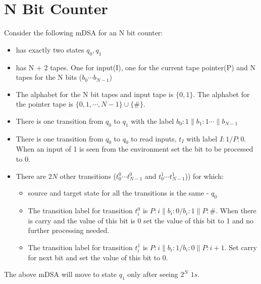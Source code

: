 \section{N Bit Counter}
Consider the following mDSA for an N bit counter:

\begin{itemize}
	\item has exactly two states $q_0, q_1$
	\item has N + 2 tapes. One for input(I), one for the current tape pointer(P) and N tapes for the N bits ($b_0 \cdots b_{N-1}$)
	\item The alphabet for the N bit tapes and input tape is $\{0,1\}$. The alphabet for the pointer tape is $\{0,1, \cdots, N-1\} \cup \{ \# \}$.
	\item There is one transition from $q_0$ to $q_1$ with the label $b_0:1 \| b_1:1 \cdots \| b_{N-1}$
	\item There is one transition from $q_0$ to $q_0$ to read inputs, $t_I$  with label  $I:1 / P:0$. When an input of 1 is seen from the environment set the bit to be processed to 0. 
	\item There are $2N$ other transitions ($t_0^0 \cdots t_{N-1}^0$ and $t_0^1 \cdots t_{N-1}^1$)) for which:
	\begin{itemize}
		\item  source and target state for all the transitions is the same - $q_0$
		\item The transition label for transition $t_i^0$ is $P:i \| b_i:0 / b_i:1 \| P:\#$. When there is carry and the value of this bit is 0 set the value of this bit to 1 and no further processing needed. 
		\item The transition label for transition $t_i^1$ is $P:i \| b_i:1 / b_i:0\| P:i+1$. Set carry for next bit and set the value of this bit to 0.
	\end{itemize}
\end{itemize}


The above mDSA will move to state $q_1$ only after seeing $2^N$ $1s$.


